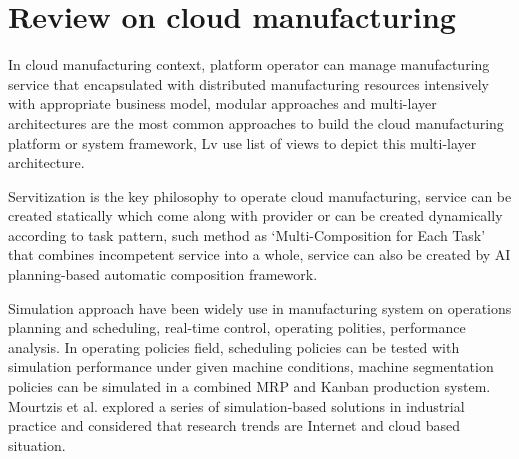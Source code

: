 \section{Review on cloud manufacturing} %
\label{sec:literature_review}


In cloud manufacturing context, platform operator can manage  manufacturing service that encapsulated with distributed manufacturing resources intensively with appropriate business model\cite{Xu2012}, modular approaches and multi-layer architectures are the most common approaches to build the cloud manufacturing platform or system framework\cite{Tao2012,Valilai2013}, Lv use list of views to depict this multi-layer architecture\cite{LvJuly312012-Aug.22012}. 

Servitization is the key philosophy to operate cloud manufacturing\cite{li2010cloud}, service can be created statically which come along with provider\cite{Tao2012} or can be created dynamically according to task pattern, such method as `Multi-Composition for Each Task'\cite{Liu2013} that combines incompetent service into a whole, service can also be created by AI planning-based automatic composition framework\cite{OhJan.-March2008}. 

Simulation approach have been widely use in manufacturing system on operations planning and scheduling, real-time control, operating polities, performance analysis\cite{Smith2003}. In operating policies field, scheduling policies can be tested with simulation performance under given machine conditions\cite{Sabuncuoglu2003}, machine
segmentation policies can be simulated in a combined MRP and Kanban production system\cite{Felberbauer9-12Dec.2012}. Mourtzis et al.\cite{Mourtzis2015} explored a series of simulation-based solutions in industrial practice and considered that research trends are Internet and cloud based situation.

